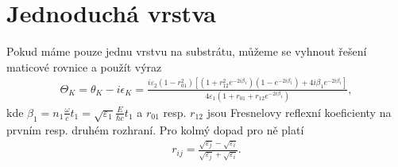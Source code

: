 \section{Jednoduchá vrstva}
Pokud máme pouze jednu vrstvu na substrátu, můžeme se vyhnout řešení maticové rovnice a použít výraz
\begin{eqnarray}
\Theta_K=\theta_K-i\epsilon_K=\frac{i\varepsilon_2(1-r^2_{01})\left[(1+r^2_{12}e^{-2i\beta_1})(1-e^{-2i\beta_1})+4i\beta_1e^{-2i\beta_1}\right]}{4\varepsilon_1(1+r_{01}+r_{12}e^{-2i\beta_1})},
\label{teor kerr}
\end{eqnarray}
kde $\beta_1=n_1\frac{\omega}{c}t_1=\sqrt{\varepsilon_1}\frac{E}{\hbar c}t_1$ a $r_{01}$ resp. $r_{12}$ jsou Fresnelovy reflexní koeficienty na prvním resp. druhém rozhraní. Pro kolmý dopad pro ně platí
\begin{eqnarray}
r_{ij}=\frac{\sqrt{\varepsilon_j}-\sqrt{\varepsilon_i}}{\sqrt{\varepsilon_j}+\sqrt{\varepsilon_i}}.
\end{eqnarray}
